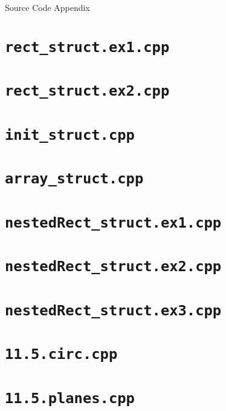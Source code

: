 \documentclass[11pt]{article}
\begin{document}
\newpage
{\LARGE Source Code Appendix}
\section*{\texttt{rect\_struct.ex1.cpp}}


\section*{\texttt{rect\_struct.ex2.cpp}}


\section*{\texttt{init\_struct.cpp}}


\section*{\texttt{array\_struct.cpp}}


\section*{\texttt{nestedRect\_struct.ex1.cpp}}


\section*{\texttt{nestedRect\_struct.ex2.cpp}}


\section*{\texttt{nestedRect\_struct.ex3.cpp}}


\section*{\texttt{11.5.circ.cpp}}


\section*{\texttt{11.5.planes.cpp}}

\end{document}
